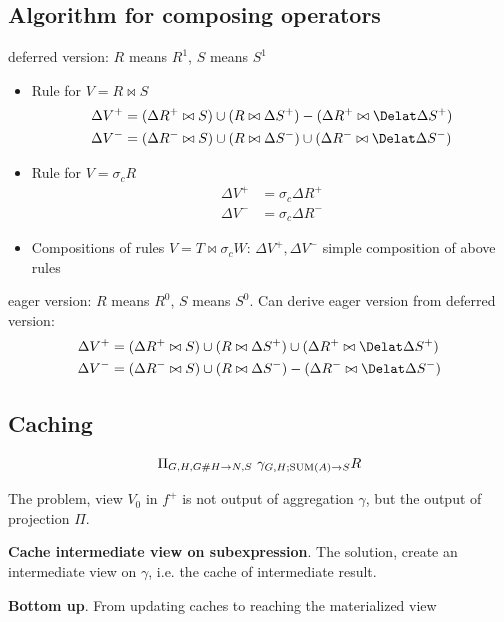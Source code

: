 \documentclass[a4paper]{report}
\begin{document}
\subsection{Algorithm for composing operators}
deferred version: $R$ means $R^1$, $S$ means $S^1$
\begin{itemize}
\item Rule for $V = R \bowtie S$
\begin{align*}
\Delta V^+ &= (\Delta R^+ \bowtie S) \cup (R \bowtie \Delta S^+) - (\Delta R^+ \bowtie \Delat \Delta S^+)\\
\Delta V^- &= (\Delta R^- \bowtie S) \cup (R \bowtie \Delta S^-) \cup (\Delta R^- \bowtie \Delat \Delta S^-)
\end{align*}
\item Rule for $V = \sigma_c R$
\begin{align*}
\Delta V^+ &= \sigma_c \Delta R^+\\
\Delta V^- &= \sigma_c \Delta R^-
\end{align*}
\item Compositions of rules $V = T\bowtie \sigma_c W$: $\Delta V^+, \Delta V^-$ simple composition of above rules
\end{itemize}
eager version: $R$ means $R^0$, $S$ means $S^0$. Can derive eager version from deferred version:
\begin{align*}
\Delta V^+ &= (\Delta R^+ \bowtie S) \cup (R \bowtie \Delta S^+) \cup (\Delta R^+ \bowtie
\Delat \Delta S^+)\\
\Delta V^- &= (\Delta R^- \bowtie S) \cup (R \bowtie \Delta S^-) - (\Delta R^- \bowtie
\Delat \Delta S^-)
\end{align*}
\subsection{Caching}
\begin{align*}
\Pi_{G, H, G\#H\rightarrow N, S}\ \gamma_{G, H; \text{SUM}(A) \rightarrow S} R
\end{align*}

The problem, view $V_0$ in $f^+$ is not output of aggregation $\gamma$, but the output of projection $\Pi$.

\textbf{Cache intermediate view on subexpression}. The solution, create an intermediate view on $\gamma$, i.e. the cache of intermediate result.

\textbf{Bottom up}. From updating caches to reaching the materialized view
\end{document}
